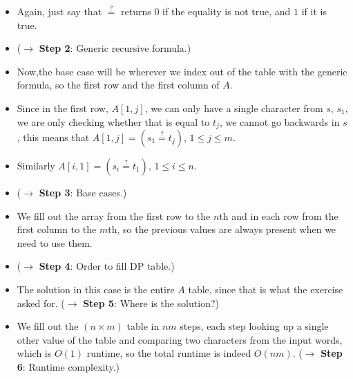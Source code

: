 \begin{itemize}
    \item Again, just say that $\stackrel{?}{=}$ returns $0$ if the equality is not true, and $1$ if it is true.
    \item ($\rightarrow$ \textbf{Step 2}: Generic recursive formula.)
    \item Now,the base case will be wherever we index out of the table with the generic formula, so the first row and the first column of $A$.
    \item Since in the first row, $A[1,j]$, we can only have a single character from $s$, $s_1$, we are only checking whether that is equal to $t_j$, we cannot go backwards in $s$, this means that $A[1,j] = (s_1 \stackrel{?}{=} t_j)$, $1\leq{}j\leq{}m$.
    \item Similarly $A[i,1] = (s_i \stackrel{?}{=} t_1)$, $1\leq{}i\leq{}n$.
    \item ($\rightarrow$ \textbf{Step 3}: Base cases.)
    \item We fill out the array from the first row to the $n$th and in each row from the first column to the $m$th, so the previous values are always present when we need to use them.
    \item ($\rightarrow$ \textbf{Step 4}: Order to fill DP table.)
    \item The solution in this case is the entire $A$ table, since that is what the exercise asked for. ($\rightarrow$ \textbf{Step 5}: Where is the solution?)
    \item We fill out the $(n \times m)$ table in $nm$ steps, each step looking up a single other value of the table and comparing two characters from the input words, which is $O(1)$ runtime, so the total runtime is indeed $O(nm)$. ($\rightarrow$ \textbf{Step 6}: Runtime complexity.)
\end{itemize}